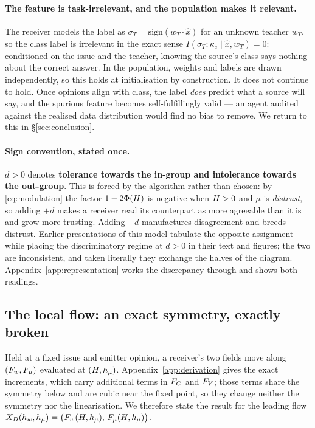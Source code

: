 \paragraph{The feature is task-irrelevant, and the population makes it relevant.}
The receiver models the label as $\sigma_T=\mathrm{sign}(w_T\cdot\hat{x})$ for an
unknown teacher $w_T$, so the class label is irrelevant in the exact sense
$I(\sigma_T;\kappa_e \mid \hat{x}, w_T)=0$: conditioned on the issue and the
teacher, knowing the source's class says nothing about the correct answer. In
the population, weights and labels are drawn independently, so this holds at
initialisation by construction. It does not continue to hold. Once opinions
align with class, the label \emph{does} predict what a source will say, and the
spurious feature becomes self-fulfillingly valid --- an agent audited against the
realised data distribution would find no bias to remove. We return to this in
\S\ref{sec:conclusion}.

\paragraph{Sign convention, stated once.}
$d>0$ denotes \textbf{tolerance towards the in-group and intolerance towards the
out-group}. This is forced by the algorithm rather than chosen: by
\eqref{eq:modulation} the factor $1-2\Phi(H)$ is negative when $H>0$ and
$\mu$ is \emph{distrust}, so adding $+d$ makes a receiver read its counterpart as
more agreeable than it is and grow more trusting. Adding $-d$ manufactures
disagreement and breeds distrust. Earlier presentations of this model tabulate
the opposite assignment while placing the discriminatory regime at $d>0$ in
their text and figures; the two are inconsistent, and taken literally they
exchange the halves of the diagram. Appendix~\ref{app:representation} works the
discrepancy through and shows both readings.

\subsection{The local flow: an exact symmetry, exactly broken}
\label{sec:flow}

Held at a fixed issue and emitter opinion, a receiver's two fields move along
$(F_{w},F_{\mu})$ evaluated at $(H,h_{\mu})$. Appendix~\ref{app:derivation} gives the
exact increments, which carry additional terms in $F_{C}$ and $F_{V}$; those terms
share the symmetry below and are cubic near the fixed point, so they change
neither the symmetry nor the linearisation. We therefore state the result for
the leading flow $X_D(h_{w},h_{\mu})=\bigl(F_{w}(H,h_{\mu}),\,F_{\mu}(H,h_{\mu})\bigr)$.

